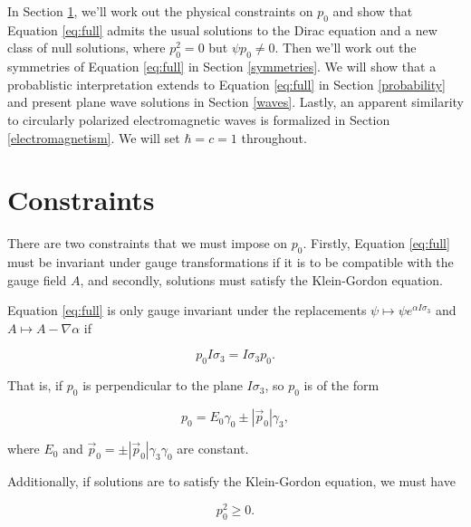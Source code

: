 \documentclass{article}
\begin{document}
  In Section \ref{constraints}, we'll work out the physical constraints on $p_0$ and show that Equation \ref{eq:full} admits the usual solutions to the Dirac equation and a new class of null solutions, where $p_0^2 = 0$ but $\psi p_0 \not = 0$. Then we'll work out the symmetries of Equation \ref{eq:full} in Section \ref{symmetries}. We will show that a probablistic interpretation extends to Equation \ref{eq:full} in Section \ref{probability} and present plane wave solutions in Section \ref{waves}. Lastly, an apparent similarity to circularly polarized electromagnetic waves is formalized in Section \ref{electromagnetism}. We will set $\hbar = c = 1$ throughout.


  \section{Constraints}\label{constraints}

  There are two constraints that we must impose on $p_0$. Firstly, Equation \ref{eq:full} must be invariant under gauge transformations if it is to be compatible with the gauge field $A$, and secondly, solutions must satisfy the Klein-Gordon equation.

  Equation \ref{eq:full} is only gauge invariant under the replacements $\psi \mapsto \psi e^{\alpha I \sigma_3}$ and $A \mapsto A - \nabla \alpha$ if 

  \begin{equation}
    p_0 I\sigma_3 = I \sigma_3 p_0. \label{momentum-perp-spin}
  \end{equation} 

  That is, if $p_0$ is perpendicular to the plane $I \sigma_3$, so $p_0$ is of the form

  \begin{equation}
    p_0 = E_0 \gamma_0 \pm |\vec p_0| \gamma_3,\label{eq:p_0}
  \end{equation} 

  where $E_0$ and $\vec p_0 = \pm |\vec p_0| \gamma_3 \gamma_0$ are constant.

  Additionally, if solutions are to satisfy the Klein-Gordon equation, we must have 

  \begin{equation}
    p_0^2 \geq 0.
  \end{equation}
\end{document}
